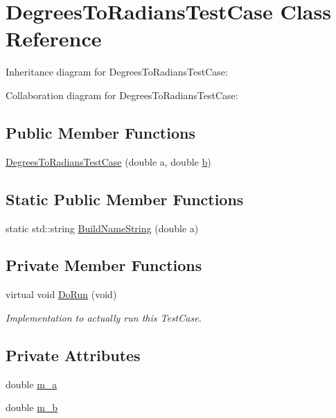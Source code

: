 \hypertarget{classDegreesToRadiansTestCase}{}\section{Degrees\+To\+Radians\+Test\+Case Class Reference}
\label{classDegreesToRadiansTestCase}


Inheritance diagram for Degrees\+To\+Radians\+Test\+Case\+:


Collaboration diagram for Degrees\+To\+Radians\+Test\+Case\+:
\subsection*{Public Member Functions}
\begin{DoxyCompactItemize}
\item 
\hyperlink{classDegreesToRadiansTestCase_a6d10069318ca94dcac65b4b9e308a6a3}{Degrees\+To\+Radians\+Test\+Case} (double a, double \hyperlink{lte__pathloss_8m_a21ad0bd836b90d08f4cf640b4c298e7c}{b})
\end{DoxyCompactItemize}
\subsection*{Static Public Member Functions}
\begin{DoxyCompactItemize}
\item 
static std\+::string \hyperlink{classDegreesToRadiansTestCase_aa23aaad160d00f86607f46c4baaaa1a4}{Build\+Name\+String} (double a)
\end{DoxyCompactItemize}
\subsection*{Private Member Functions}
\begin{DoxyCompactItemize}
\item 
virtual void \hyperlink{classDegreesToRadiansTestCase_a53eee6918ef06228444edd7c5be40db1}{Do\+Run} (void)
\begin{DoxyCompactList}\small\item\em Implementation to actually run this Test\+Case. \end{DoxyCompactList}\end{DoxyCompactItemize}
\subsection*{Private Attributes}
\begin{DoxyCompactItemize}
\item 
double \hyperlink{classDegreesToRadiansTestCase_a552e2b2148dc2c7518cb48e095322d01}{m\+\_\+a}
\item 
double \hyperlink{classDegreesToRadiansTestCase_a16da656cfa260ab14ca4f64dba28bbef}{m\+\_\+b}
\end{DoxyCompactItemize}
